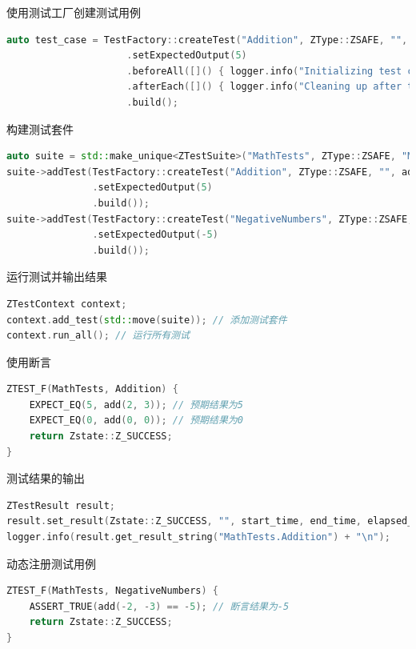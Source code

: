 \documentclass{beamer}
\begin{document}
\begin{frame}[fragile]{使用测试工厂创建测试用例}
    \begin{lstlisting}[language=C++]
auto test_case = TestFactory::createTest("Addition", ZType::ZSAFE, "", add, 2, 3)
                     .setExpectedOutput(5)
                     .beforeAll([]() { logger.info("Initializing test case resources...\n"); })
                     .afterEach([]() { logger.info("Cleaning up after test...\n"); })
                     .build();
    \end{lstlisting}
\end{frame}

\begin{frame}[fragile]{构建测试套件}
    \begin{lstlisting}[language=C++]
auto suite = std::make_unique<ZTestSuite>("MathTests", ZType::ZSAFE, "Mathematical operations tests");
suite->addTest(TestFactory::createTest("Addition", ZType::ZSAFE, "", add, 2, 3)
               .setExpectedOutput(5)
               .build());
suite->addTest(TestFactory::createTest("NegativeNumbers", ZType::ZSAFE, "", add, -2, -3)
               .setExpectedOutput(-5)
               .build());
    \end{lstlisting}
\end{frame}

\begin{frame}[fragile]{运行测试并输出结果}
    \begin{lstlisting}[language=C++]
ZTestContext context;
context.add_test(std::move(suite)); // 添加测试套件
context.run_all(); // 运行所有测试
    \end{lstlisting}
\end{frame}

\begin{frame}[fragile]{使用断言}
    \begin{lstlisting}[language=C++]
ZTEST_F(MathTests, Addition) {
    EXPECT_EQ(5, add(2, 3)); // 预期结果为5
    EXPECT_EQ(0, add(0, 0)); // 预期结果为0
    return Zstate::Z_SUCCESS;
}
    \end{lstlisting}
\end{frame}

\begin{frame}[fragile]{测试结果的输出}
    \begin{lstlisting}[language=C++]
ZTestResult result;
result.set_result(Zstate::Z_SUCCESS, "", start_time, end_time, elapsed_time);
logger.info(result.get_result_string("MathTests.Addition") + "\n");
    \end{lstlisting}
\end{frame}

\begin{frame}[fragile]{动态注册测试用例}
    \begin{lstlisting}[language=C++]
ZTEST_F(MathTests, NegativeNumbers) {
    ASSERT_TRUE(add(-2, -3) == -5); // 断言结果为-5
    return Zstate::Z_SUCCESS;
}
    \end{lstlisting}
\end{frame}
\end{document}
